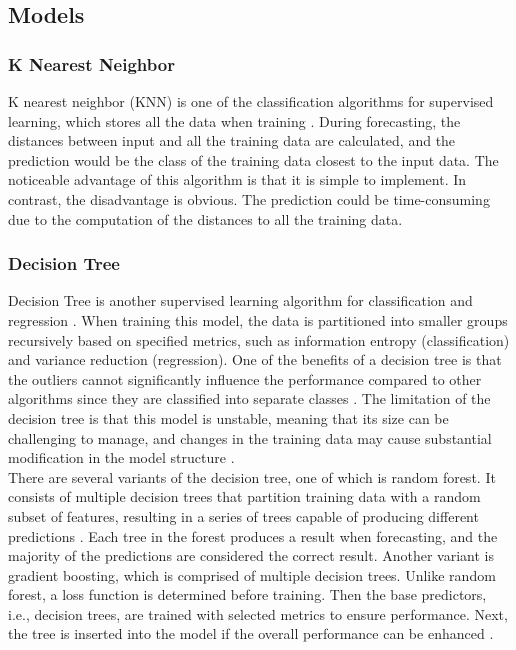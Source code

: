 \documentclass[12pt,twoside]{report}
\begin{document}
\subsection{Models}
\label{model_review}
\subsubsection{K Nearest Neighbor}
K nearest neighbor (KNN) is one of the classification algorithms for supervised learning, which stores all the data when training \citep{RN33}. During forecasting, the distances between input and all the training data are calculated, and the prediction would be the class of the training data closest to the input data. The noticeable advantage of this algorithm is that it is simple to implement. In contrast, the disadvantage is obvious. The prediction could be time-consuming due to the computation of the distances to all the training data. 

\subsubsection{Decision Tree}
Decision Tree is another supervised learning algorithm for classification and regression \citep{RN33}. When training this model,  the data is partitioned into smaller groups recursively based on specified metrics, such as information entropy (classification) and variance reduction (regression). One of the benefits of a decision tree is that the outliers cannot significantly influence the performance compared to other algorithms since they are classified into separate classes \citep{RN31}. The limitation of the decision tree is that this model is unstable, meaning that its size can be challenging to manage, and changes in the training data may cause substantial modification in the model structure \citep{RN33}. 
\\

There are several variants of the decision tree, one of which is random forest. It consists of multiple decision trees that partition training data with a random subset of features, resulting in a series of trees capable of producing different predictions \citep{RN34}. Each tree in the forest produces a result when forecasting, and the majority of the predictions are considered the correct result. Another variant is gradient boosting, which is comprised of multiple decision trees. Unlike random forest, a loss function is determined before training. Then the base predictors, i.e., decision trees, are trained with selected metrics to ensure performance. Next, the tree is inserted into the model if the overall performance can be enhanced \citep{RN35}. 
\end{document}
